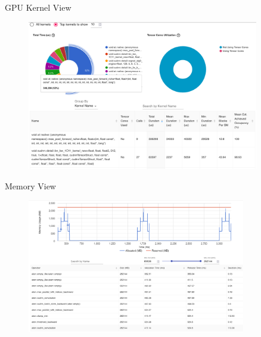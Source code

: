 \documentclass[compress,aspectratio=169]{beamer}
\begin{document}
\begin{frame}{GPU Kernel View}
    \vspace{-1em}
\begin{center}
    \begin{figure}
        \includegraphics[width=0.9\textwidth]{./assets/scap_gtx1080_profiler-torch_batch-size-64_14650758_gpu-kernel-view}
    \end{figure}
    \end{center}
\end{frame}

\begin{frame}{Memory View}
    \vspace{-1em}
\begin{center}
    \begin{figure}
        \includegraphics[width=0.85\textwidth]{./assets/scap_gtx1080_profiler-torch_batch-size-64_14650758_memory-view}
    \end{figure}
    \end{center}
\end{frame}
\end{document}
